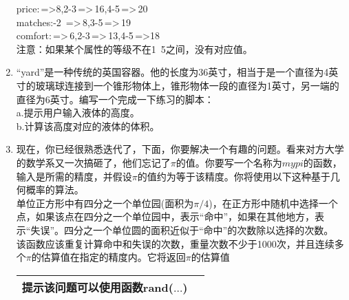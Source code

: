 \documentclass[UTF8]{ctexart}
\begin{document}
\begin{enumerate}
	price:\,=>8,2-3\,=>\,16,4-5\,=>\,20\\
	matches:-2 \,=>\,8,3-5\,=>\,19\\
	comfort:\,=>\,6,2-3\,=>\,13,4-5\,=>18\\
	注意：如果某个属性的等级不在1~5之间，没有对应值。
	\item “yard”是一种传统的英国容器。他的长度为36英寸，相当于是一个直径为4英寸的玻璃球连接到一个锥形物体上，锥形物体一段的直径为1英寸，另一端的直径为6英寸。编写一个完成一下练习的脚本：\\
	a.提示用户输入液体的高度。\\
	b.计算该高度对应的液体的体积。
	\item 现在，你已经很熟悉迭代了，下面，你要解决一个有趣的问题。看来对方大学的数学系又一次搞砸了，他们忘记了$\pi$的值。你要写一个名称为$mypi$的函数，输入是所需的精度，并假设$\pi$的值约为等于该精度。你将使用以下这种基于几何概率的算法。\\
	单位正方形中有四分之一个单位园(面积为$\pi/4$)，在正方形中随机中选择一个点，如果该点在四分之一个单位园中，表示“命中”，如果在其他地方，表示“失误”。四分之一个单位圆的面积近似于“命中”的次数除以选择的次数。\\该函数应该重复计算命中和失误的次数，重量次数不少于1000次，并且连续多个$\pi$的估算值在指定的精度内。它将返回$\pi$的估算值\\
	\begin{table}[H]
		\centering
		\begin{tabular}{|p{10cm}|l|}
		\hline
		\textbf{提示}\qquad 该问题可以使用函数rand($\dots$)\\
		\hline
		\end{tabular}
	\end{table}
\end{enumerate}
\end{document}
